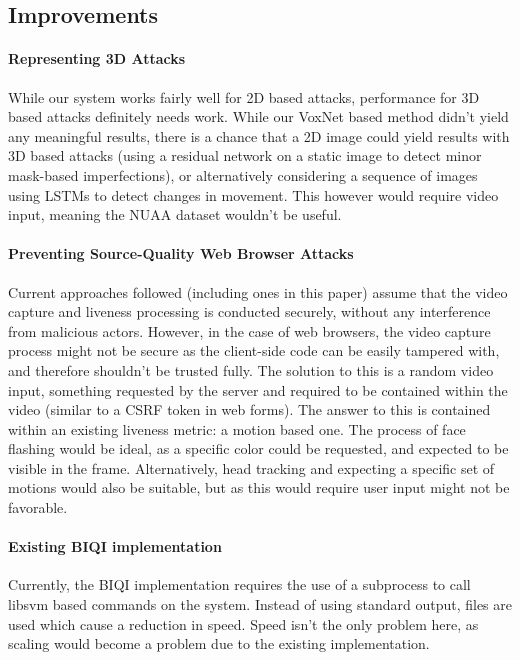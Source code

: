 \documentclass[10pt,a4paper]{article}
\begin{document}
    \subsection{Improvements}
        \paragraph{Representing 3D Attacks}
        While our system works fairly well for 2D based attacks, performance for 3D based attacks definitely needs work.
        While our VoxNet based method didn't yield any meaningful results, there is a chance that a 2D image could yield results
        with 3D based attacks (using a residual network on a static image to detect minor mask-based imperfections), or alternatively
        considering a sequence of images using LSTMs to detect changes in movement. This however would require video input, meaning the
        NUAA dataset wouldn't be useful.

        \paragraph{Preventing Source-Quality Web Browser Attacks}
        Current approaches followed (including ones in this paper) assume that the video capture and liveness processing is conducted securely, 
        without any interference from malicious actors. However, in the case of web browsers, the video capture process might not be secure as
        the client-side code can be easily tampered with, and therefore shouldn't be trusted fully. The solution to this is a random video input,
        something requested by the server and required to be contained within the video (similar to a CSRF token in web forms). The answer to this
        is contained within an existing liveness metric: a motion based one. The process of face flashing would be ideal, as a specific color could
        be requested, and expected to be visible in the frame. Alternatively, head tracking and expecting a specific set of motions would also be suitable,
        but as this would require user input might not be favorable.

        
        \paragraph{Existing BIQI implementation}
        Currently, the BIQI implementation requires the use of a subprocess to call libsvm based commands on the system. Instead of using standard output, files are used which
        cause a reduction in speed.
        Speed isn't the only problem here, as scaling would become a problem due to the existing implementation. 
\end{document}
